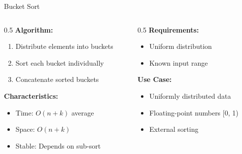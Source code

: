 \documentclass[aspectratio=169,xcolor=dvipsnames]{beamer}
\begin{document}
\begin{frame}{Bucket Sort}
  \begin{columns}
    \begin{column}{0.5\textwidth}
      \textbf{Algorithm:}
      \begin{enumerate}
        \item Distribute elements into buckets
        \item Sort each bucket individually
        \item Concatenate sorted buckets
      \end{enumerate}

      \vspace{0.3cm}
      \textbf{Characteristics:}
      \begin{itemize}
        \item Time: $O(n + k)$ average
        \item Space: $O(n + k)$
        \item Stable: Depends on sub-sort
      \end{itemize}
    \end{column}

    \begin{column}{0.5\textwidth}
      \textbf{Requirements:}
      \begin{itemize}
        \item Uniform distribution
        \item Known input range
      \end{itemize}

      \vspace{0.3cm}
      \textbf{Use Case:}
      \begin{itemize}
        \item Uniformly distributed data
        \item Floating-point numbers [0, 1)
        \item External sorting
      \end{itemize}
    \end{column}
  \end{columns}
\end{frame}
\end{document}
